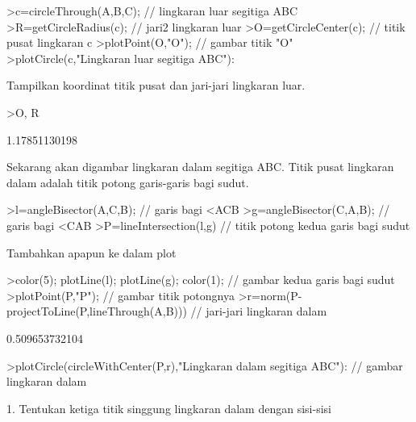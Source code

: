 \documentclass{article}
\begin{document}
\begin{eulernotebook}
\begin{eulercomment}
\begin{eulercomment}
\begin{eulercomment}
\end{eulercomment}
\begin{eulerprompt}
>c=circleThrough(A,B,C); // lingkaran luar segitiga ABC
>R=getCircleRadius(c); // jari2 lingkaran luar 
>O=getCircleCenter(c); // titik pusat lingkaran c 
>plotPoint(O,"O"); // gambar titik "O"
>plotCircle(c,"Lingkaran luar segitiga ABC"):
\end{eulerprompt}
\begin{eulercomment}
Tampilkan koordinat titik pusat dan jari-jari lingkaran luar.
\end{eulercomment}
\begin{eulerprompt}
>O, R
\end{eulerprompt}
\begin{euleroutput}
  [1.16667,  1.16667]
  1.17851130198
\end{euleroutput}
\begin{eulercomment}
Sekarang akan digambar lingkaran dalam segitiga ABC. Titik pusat lingkaran dalam adalah
titik potong garis-garis bagi sudut.
\end{eulercomment}
\begin{eulerprompt}
>l=angleBisector(A,C,B); // garis bagi <ACB
>g=angleBisector(C,A,B); // garis bagi <CAB
>P=lineIntersection(l,g) // titik potong kedua garis bagi sudut
\end{eulerprompt}
\begin{euleroutput}
  [0.86038,  0.86038]
\end{euleroutput}
\begin{eulercomment}
Tambahkan apapun ke dalam plot
\end{eulercomment}
\begin{eulerprompt}
>color(5); plotLine(l); plotLine(g); color(1); // gambar kedua garis bagi sudut
>plotPoint(P,"P"); // gambar titik potongnya
>r=norm(P-projectToLine(P,lineThrough(A,B))) // jari-jari lingkaran dalam
\end{eulerprompt}
\begin{euleroutput}
  0.509653732104
\end{euleroutput}
\begin{eulerprompt}
>plotCircle(circleWithCenter(P,r),"Lingkaran dalam segitiga ABC"): // gambar lingkaran dalam
\end{eulerprompt}
\begin{eulercomment}
1. Tentukan ketiga titik singgung lingkaran dalam dengan sisi-sisi

\end{eulercomment}
\end{eulercomment}
\end{eulercomment}
\end{eulernotebook}
\end{document}
